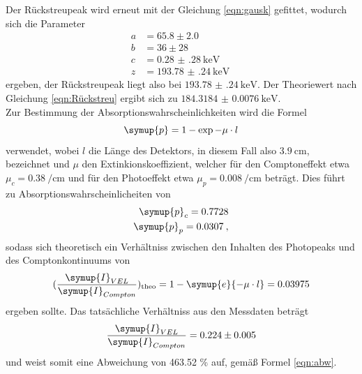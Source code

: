 Der Rückstreupeak wird erneut mit der Gleichung \ref{eqn:gausk} gefittet, wodurch sich
die Parameter
\begin{align*}
  a &= 65.8 \pm 2.0 \\
  b &= 36 \pm 28 \\
  c &= \SI{0.28(28)}{\kilo\electronvolt}\\
  z &= \SI{193.78(24)}{\kilo\electronvolt} \:
\end{align*}
ergeben, der Rückstreupeak liegt also bei $\SI{193.78(24)}{\kilo\electronvolt}$.
Der Theoriewert nach Gleichung \ref{eqn:Rückstreu} ergibt sich zu $\SI{184.3184(76)}{\kilo\electronvolt}$.
\\
Zur Bestimmung der Absorptionswahrscheinlichkeiten wird die Formel
\begin{equation}
  \symup{p} = 1-\exp{-\mu \cdot l}
\end{equation}
verwendet, wobei $l$ die Länge des Detektors, in diesem Fall also $\SI{3.9}{\centi\meter}$, bezeichnet
und $\mu$ den Extinkionskoeffizient, welcher für den Comptoneffekt etwa
$\mu_{c}=\SI{0.38}{\per\centi\meter}$ und für den Photoeffekt etwa
$\mu_{p}=\SI{0.008}{\per\centi\meter}$ beträgt.
Dies führt zu Absorptionswahrscheinlicheiten von
\begin{align*}
  \symup{p}_{c} = 0.7728 \\
  \symup{p}_{p} = 0.0307 \: ,
\end{align*}
sodass sich theoretisch ein Verhältniss zwischen den Inhalten des Photopeaks und des
Comptonkontinuums von
\begin{equation*}
  (\frac{\symup{I}_{VEL}}{\symup{I}_{Compton}})_{\text{theo}} = 1-\symup{e}{-\mu \cdot l}
  = 0.03975
\end{equation*}
ergeben sollte. Das tatsächliche Verhältniss aus den Messdaten beträgt
\begin{equation*}
  \frac{\symup{I}_{VEL}}{\symup{I}_{Compton}}
  = 0.224 \pm 0.005
\end{equation*}
und weist somit eine Abweichung von 463.52 \% auf, gemäß Formel \ref{eqn:abw}.


